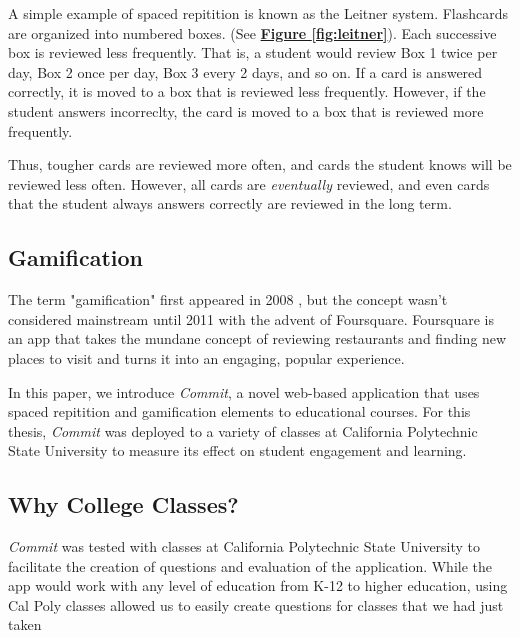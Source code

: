 \par A simple example of spaced repitition is known as the Leitner system. Flashcards are organized into numbered boxes. (See \textbf{\hyperref[fig:leitner]{Figure \ref*{fig:leitner}}}). Each successive box is reviewed less frequently. That is, a student would review Box 1 twice per day, Box 2 once per day, Box 3 every 2 days, and so on. If a card is answered correctly, it is moved to a box that is reviewed less frequently. However, if the student answers incorreclty, the card is moved to a box that is reviewed more frequently.

\par Thus, tougher cards are reviewed more often, and cards the student knows will be reviewed less often. However, all cards are \textit{eventually} reviewed, and even cards that the student always answers correctly are reviewed in the long term.

\subsection{Gamification}
\par The term "gamification" first appeared in 2008 \cite{Deterding:2011:GDE:2181037.2181040}, but the concept wasn't considered mainstream until 2011 with the advent of Foursquare. Foursquare is an app that takes the mundane concept of reviewing restaurants and finding new places to visit and turns it into an engaging, popular experience.


\par In this paper, we introduce \textit{Commit}, a novel web-based application that uses spaced repitition and gamification elements to educational courses. For this thesis, \textit{Commit} was deployed to a variety of classes at California Polytechnic State University to measure its effect on student engagement and learning.

\subsection{Why College Classes?}
\par \textit{Commit} was tested with classes at California Polytechnic State University to facilitate the creation of questions and evaluation of the application. While the app would work with any level of education from K-12 to higher education, using Cal Poly classes allowed us to easily create questions for classes that we had just taken


